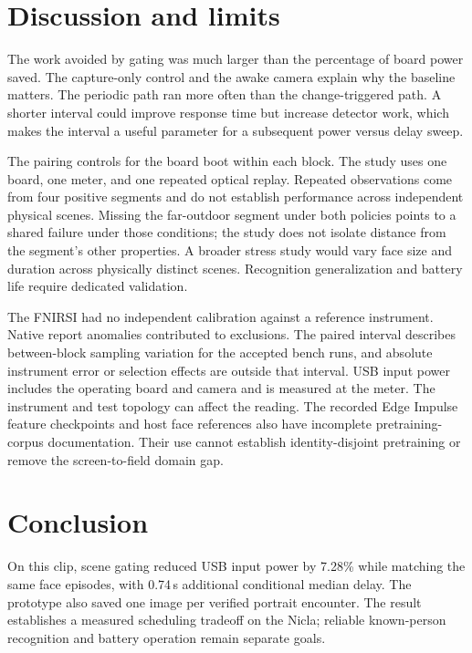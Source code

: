\documentclass[10pt,letterpaper,twocolumn]{article}
\begin{document}
\section{Discussion and limits}
The work avoided by gating was much larger than the percentage of board power saved. The capture-only control and the awake camera explain why the baseline matters. The periodic path ran more often than the change-triggered path. A shorter interval could improve response time but increase detector work, which makes the interval a useful parameter for a subsequent power versus delay sweep.

The pairing controls for the board boot within each block. The study uses one board, one meter, and one repeated optical replay. Repeated observations come from four positive segments and do not establish performance across independent physical scenes. Missing the far-outdoor segment under both policies points to a shared failure under those conditions; the study does not isolate distance from the segment's other properties. A broader stress study would vary face size and duration across physically distinct scenes. Recognition generalization and battery life require dedicated validation.

The FNIRSI had no independent calibration against a reference instrument. Native report anomalies contributed to exclusions. The paired interval describes between-block sampling variation for the accepted bench runs, and absolute instrument error or selection effects are outside that interval. USB input power includes the operating board and camera and is measured at the meter. The instrument and test topology can affect the reading. The recorded Edge Impulse feature checkpoints and host face references also have incomplete pretraining-corpus documentation. Their use cannot establish identity-disjoint pretraining or remove the screen-to-field domain gap.

\section{Conclusion}
On this clip, scene gating reduced USB input power by 7.28\% while matching the same face episodes, with 0.74\,s additional conditional median delay. The prototype also saved one image per verified portrait encounter. The result establishes a measured scheduling tradeoff on the Nicla; reliable known-person recognition and battery operation remain separate goals.
\end{document}
